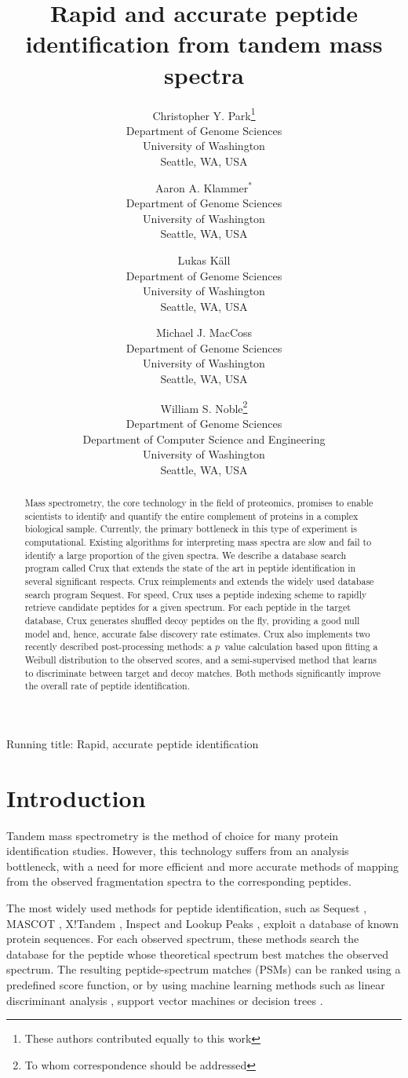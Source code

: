 \documentclass[12pt]{article}
\title{Rapid and accurate peptide identification from tandem mass spectra}
\author{Christopher Y. Park\footnote{These authors contributed equally 
to this work}\\
Department of Genome Sciences\\
University of Washington\\
Seattle, WA, USA
\and
Aaron A. Klammer$^*$\\
Department of Genome Sciences\\
University of Washington\\
Seattle, WA, USA
\and
Lukas K\"{a}ll\\
Department of Genome Sciences\\
University of Washington\\
Seattle, WA, USA
\and
Michael J. MacCoss\\
Department of Genome Sciences\\
University of Washington\\
Seattle, WA, USA
\and
William S. Noble\footnote{To whom correspondence should
  be addressed}\\
Department of Genome Sciences\\
Department of Computer Science and Engineering\\
University of Washington\\
Seattle, WA, USA
}
\begin{document}
\maketitle

\noindent Running title: {\sc Rapid, accurate peptide identification}

\clearpage

\begin{abstract}

\noindent
Mass spectrometry, the core technology in the field of proteomics,
promises to enable scientists to identify and quantify the entire
complement of proteins in a complex biological sample.  Currently, the
primary bottleneck in this type of experiment is computational.
Existing algorithms for interpreting mass spectra are slow and fail to
identify a large proportion of the given spectra.  We describe a
database search program called Crux that extends the state of the art
in peptide identification in several significant respects.  Crux
reimplements and extends the widely used database search program {\sc
Sequest}.  For speed, Crux uses a peptide indexing scheme to rapidly
retrieve candidate peptides for a given spectrum.  For each peptide in
the target database, Crux generates shuffled decoy peptides on the
fly, providing a good null model and, hence, accurate false discovery
rate estimates.  Crux also implements two recently described
post-processing methods: a $p$~value calculation based upon fitting a
Weibull distribution to the observed scores, and a semi-supervised
method that learns to discriminate between target and decoy matches.
Both methods significantly improve the overall rate of peptide
identification.
\end{abstract}

\clearpage

\section{Introduction}

Tandem mass spectrometry is the method of choice for many protein
identification studies.  However, this technology suffers from an
analysis bottleneck, with a need for more efficient and more accurate
methods of mapping from the observed fragmentation spectra to the
corresponding peptides.

The most widely used methods for peptide identification, such as
{\sc Sequest} \cite{eng:approach}, MASCOT \cite{perkins:probability},
X!Tandem \cite{craig:tandem}, Inspect \cite{tanner:inspect} and Lookup Peaks
\cite{bern:lookup}, 
exploit a database of known protein sequences.  For each observed
spectrum, these methods search the database for the peptide whose
theoretical spectrum best matches the observed spectrum.  The
resulting peptide-spectrum matches (PSMs) can be ranked using a
predefined score function, or by using machine learning methods such
as linear discriminant analysis \cite{keller:empirical}, support
vector machines \cite{anderson:new, kall:semi-supervised} or decision
trees \cite{elias:intensity}.
\end{document}
